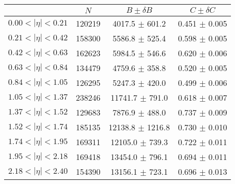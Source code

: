\begin{tabular}{lccc}
\hline
    &   $N$   & $B \pm \delta B$  &  $C \pm \delta C$ \\
\hline
$0.00 < |\eta| <0.21$          & 120219     & 4017.5     $\pm$ 601.2 & 0.451      $\pm$ 0.005 \\
$0.21 < |\eta| <0.42$          & 158300     & 5586.8     $\pm$ 525.4 & 0.598      $\pm$ 0.005 \\
$0.42 < |\eta| <0.63$          & 162623     & 5984.5     $\pm$ 546.6 & 0.620      $\pm$ 0.006 \\
$0.63 < |\eta| <0.84$          & 134479     & 4759.6     $\pm$ 358.8 & 0.520      $\pm$ 0.005 \\
$0.84 < |\eta| <1.05$          & 126295     & 5247.3     $\pm$ 420.0 & 0.499      $\pm$ 0.006 \\
$1.05 < |\eta| <1.37$          & 238246     & 11741.7    $\pm$ 791.0 & 0.618      $\pm$ 0.007 \\
$1.37 < |\eta| <1.52$          & 129683     & 7876.9     $\pm$ 488.0 & 0.737      $\pm$ 0.009 \\
$1.52 < |\eta| <1.74$          & 185135     & 12138.8    $\pm$ 1216.8 & 0.730      $\pm$ 0.010 \\
$1.74 < |\eta| <1.95$          & 169311     & 12105.0    $\pm$ 739.3 & 0.722      $\pm$ 0.011 \\
$1.95 < |\eta| <2.18$          & 169418     & 13454.0    $\pm$ 796.1 & 0.694      $\pm$ 0.011 \\
$2.18 < |\eta| <2.40$          & 154390     & 13156.1    $\pm$ 723.1 & 0.696      $\pm$ 0.013 \\
\hline
\end{tabular}
